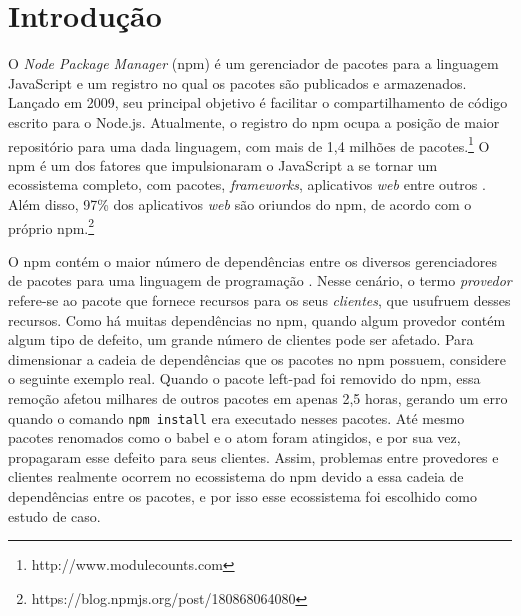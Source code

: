 \chapter{Introdução}
\label{cap:introducao}

O \textit{Node Package Manager} (\textsf{npm}) é um gerenciador de pacotes para a linguagem \textsf{JavaScript} e um registro no qual os pacotes são publicados e armazenados. Lançado em 2009, seu principal objetivo é facilitar o compartilhamento de código escrito para o \textsf{Node.js}. Atualmente, o registro do \textsf{npm} ocupa a posição de maior repositório para uma dada linguagem, com mais de 1,4 milhões de pacotes.\footnote{http://www.modulecounts.com} O \textsf{npm} é um dos fatores que impulsionaram o \textsf{JavaScript} a se tornar um ecossistema completo, com pacotes, \textit{frameworks}, aplicativos \textit{web} entre outros \cite{introduction:npm}. Além disso, 97\% dos aplicativos \textit{web} são oriundos do \textsf{npm}, de acordo com o próprio \textsf{npm}.\footnote{https://blog.npmjs.org/post/180868064080}

O \textsf{npm} contém o maior número de dependências entre os diversos gerenciadores de pacotes para uma linguagem de programação \cite{teorical_reference:npm_2}. Nesse cenário, o termo \textit{provedor} refere-se ao pacote que fornece recursos para os seus \textit{clientes}, que usufruem desses recursos. Como há muitas dependências no \textsf{npm}, quando algum provedor contém algum tipo de defeito, um grande número de clientes pode ser afetado. Para dimensionar a cadeia de dependências que os pacotes no \textsf{npm} possuem, considere o seguinte exemplo real. Quando o pacote \textsf{left-pad} foi removido do \textsf{npm}, essa remoção afetou milhares de outros pacotes em apenas 2,5 horas, gerando um erro quando o comando \texttt{npm install} era executado nesses pacotes. Até mesmo pacotes renomados como o \textsf{babel} e o \textsf{atom} foram atingidos, e por sua vez, propagaram esse defeito para seus clientes. Assim, problemas entre provedores e clientes realmente ocorrem no ecossistema do \textsf{npm} devido a essa cadeia de dependências entre os pacotes, e por isso esse ecossistema foi escolhido como estudo de caso.

